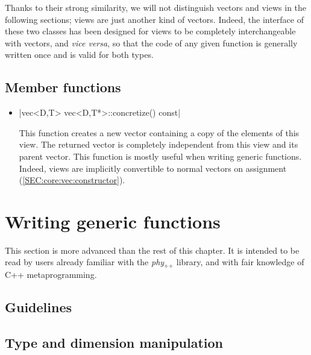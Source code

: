 \documentclass[12pt,a4paper]{report}
\newcommand{\phypp}{\textit{phy}$_{\text{++}}$\xspace}
\newenvironment{warning}
{
    \begin{mdframed}[style=warning,frametitle={Warning}]
}
{
    \end{mdframed}
}
\begin{document}
Thanks to their strong similarity, we will not distinguish vectors and views in the following sections; views are just another kind of vectors. Indeed, the interface of these two classes has been designed for views to be completely interchangeable with vectors, and {\it vice versa}, so that the code of any given function is generally written once and is valid for both types.

\subsection{Member functions \label{SEC:core:view:member_fun}}

\begin{itemize}
\item \cppinline|vec<D,T> vec<D,T*>::concretize() const|

This function creates a new vector containing a copy of the elements of this view. The returned vector is completely independent from this view and its parent vector. This function is mostly useful when writing generic functions. Indeed, views are implicitly convertible to normal vectors on assignment (\ref{SEC:core:vec:constructor}).
\end{itemize}

\section{Writing generic functions \label{SEC:core:meta}}

\begin{warning}
This section is more advanced than the rest of this chapter. It is intended to be read by users already familiar with the \phypp library, and with fair knowledge of C++ metaprogramming.
\end{warning}

\subsection{Guidelines}


\subsection{Type and dimension manipulation}
\end{document}

